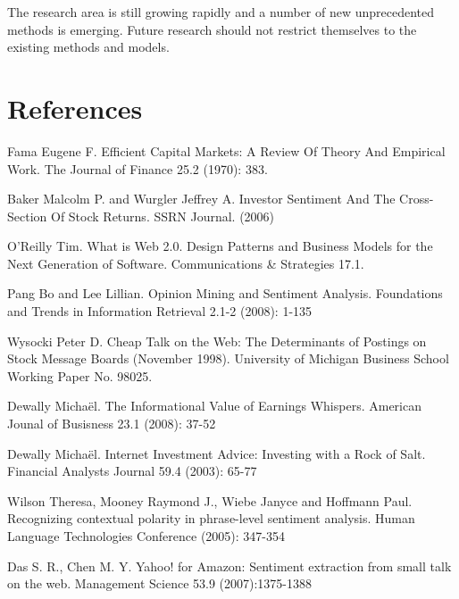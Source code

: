 The research area is still growing rapidly and a number of new unprecedented methods is emerging. Future research should not restrict themselves to the existing methods and models.

\section*{References}

\begin{enumerate}[{$[$}1{$]$}]
  \item Fama Eugene F. Efficient Capital Markets: A Review Of Theory And Empirical Work. The Journal of Finance 25.2 (1970): 383.
  \item Baker Malcolm P. and Wurgler Jeffrey A. Investor Sentiment And The Cross-Section Of Stock Returns. SSRN Journal. (2006)
  \item O'Reilly Tim. What is Web 2.0. Design Patterns and Business Models for the Next Generation of Software. Communications \& Strategies 17.1.
  \item Pang Bo and Lee Lillian. Opinion Mining and Sentiment Analysis. Foundations and Trends in Information Retrieval 2.1-2 (2008): 1-135
  \item Wysocki Peter D. Cheap Talk on the Web: The Determinants of Postings on Stock Message Boards (November 1998). University of Michigan Business School Working Paper No. 98025.
  \item Dewally Micha\"{e}l. The Informational Value of Earnings Whispers. American Jounal of Busisness 23.1 (2008): 37-52
  \item Dewally Micha\"{e}l. Internet Investment Advice: Investing with a Rock of Salt. Financial Analysts Journal 59.4 (2003): 65-77
  \item Wilson Theresa, Mooney Raymond J., Wiebe Janyce and Hoffmann Paul. Recognizing contextual polarity in phrase-level sentiment analysis. Human Language Technologies Conference (2005): 347-354
  \item Das S. R., Chen M. Y. Yahoo! for Amazon: Sentiment extraction from small talk on the web. Management Science 53.9 (2007):1375-1388
\end{enumerate}
